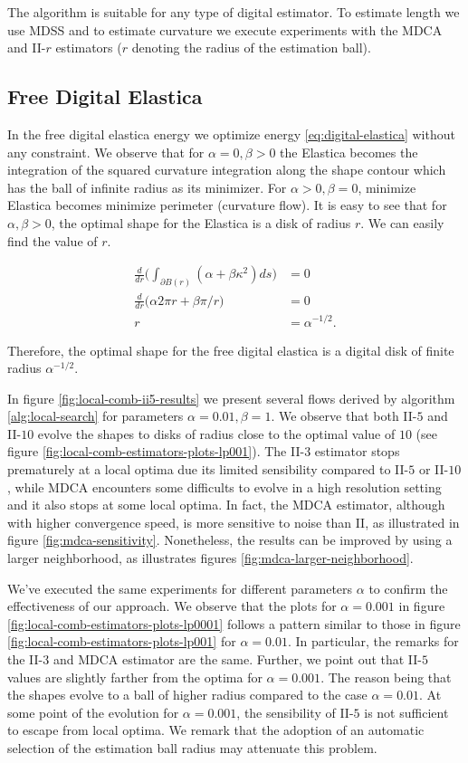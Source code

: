 The algorithm is suitable for any type of digital estimator. To estimate length we use MDSS and to estimate curvature we execute experiments with the MDCA and II-$r$ estimators ($r$ denoting the radius of the estimation ball). 


\subsection{Free Digital Elastica}
In the free digital elastica energy we optimize energy \ref{eq:digital-elastica} without any constraint. We observe that for $\alpha=0, \beta >0$ the Elastica becomes the integration of the squared curvature integration along the shape contour which has the ball of infinite radius as its minimizer. For $\alpha > 0, \beta=0$, minimize Elastica becomes minimize perimeter (curvature flow). It is easy to see that for $\alpha, \beta > 0$, the optimal shape for the Elastica is a disk of radius $r$. We can easily find the value of $r$.

\begin{align*}
	\frac{d}{dr}\big( \int_{\partial B(r)}{ (\alpha + \beta \kappa ^2) ds} \big ) &= 0\\
	\frac{d}{dr}\big( \alpha 2\pi r + \beta \pi/r \big) &= 0\\
	r &= \alpha^{-1/2}.
\end{align*}  

Therefore, the optimal shape for the free digital elastica is a digital disk of finite radius $\alpha^{-1/2}$.


In figure \ref{fig:local-comb-ii5-results} we present several flows derived by algorithm \ref{alg:local-search} for parameters $\alpha=0.01, \beta=1$. We observe that both II-$5$ and II-$10$ evolve the shapes to disks of radius close to the optimal value of $10$ (see figure \ref{fig:local-comb-estimators-plots-lp001}). The II-$3$ estimator stops prematurely at a local optima due its limited sensibility compared to II-$5$ or II-$10$, while MDCA encounters some difficults to evolve in a high resolution setting and it also stops at some local optima. In fact, the MDCA estimator, although with higher convergence speed, is more sensitive to noise than II, as illustrated in figure \ref{fig:mdca-sensitivity}. Nonetheless, the results can be improved by using a larger neighborhood, as illustrates figures \ref{fig:mdca-larger-neighborhood}.



We've executed the same experiments for different parameters $\alpha$ to confirm the effectiveness of our approach. We observe that the plots for $\alpha=0.001$ in figure \ref{fig:local-comb-estimators-plots-lp0001} follows a pattern similar to those in figure \ref{fig:local-comb-estimators-plots-lp001} for $\alpha=0.01$. In particular, the remarks for the II-$3$ and MDCA estimator are the same. Further, we point out that II-$5$ values are slightly farther from the optima for $\alpha=0.001$. The reason being that the shapes evolve to a ball of higher radius compared to the case $\alpha=0.01$. At some point of the evolution for $\alpha=0.001$, the sensibility of II-$5$ is not sufficient to escape from local optima. We remark that the adoption of an automatic selection of the estimation ball radius may attenuate this problem.


